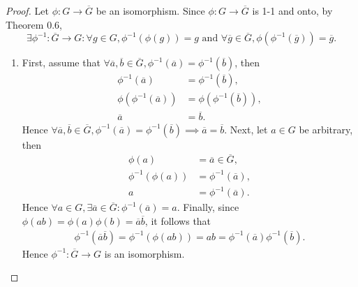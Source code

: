 \documentclass{article}
\theoremstyle{definition}
\begin{document}
 \begin{proof}
     Let $\phi: G \to \overline{G}$ be an isomorphism. Since $\phi:G \to \overline{G}$ is 1-1 and onto, by Theorem 0.6,
         \begin{equation*}
             \exists \phi^{-1}:\overline{G} \to G: \forall g \in G, \phi^{-1}(\phi(g)) = g \text{ and } \forall \overline{g} \in \overline{G}, \phi(\phi^{-1}(\overline{g})) = \overline{g}. 
         \end{equation*}
     \begin{enumerate}[label=(\roman*)]
         \item First, assume that $\forall \overline{a}, \overline{b} \in \overline{G}, \phi^{-1}(\overline{a}) = \phi^{-1}(\overline{b})$, then
         \begin{align*}
             \phi^{-1}(\overline{a}) &= \phi^{-1}(\overline{b}), \\
             \phi(\phi^{-1}(\overline{a})) &= \phi(\phi^{-1}(\overline{b})), \\
             \overline{a} &= \overline{b}.
         \end{align*}
         Hence $\forall \overline{a}, \overline{b} \in \overline{G}, \phi^{-1}(\overline{a}) = \phi^{-1}(\overline{b}) \implies \overline{a} = \overline{b}$. Next, let $a \in G$ be arbitrary, then
         \begin{align*}
             \phi(a) &= \overline{a} \in \overline{G}, \\
             \phi^{-1}(\phi(a)) &= \phi^{-1}(\overline{a}), \\
             a &= \phi^{-1}(\overline{a}).
         \end{align*}
         Hence $\forall a \in G, \exists \overline{a} \in \overline{G}: \phi^{-1}(\overline{a}) = a$. Finally, since $\phi(ab) = \phi(a)\phi(b) = \overline{a}\overline{b}$, it follows that
         \begin{align*}
             \phi^{-1}(\overline{a}\overline{b}) = \phi^{-1}(\phi(ab)) = ab = \phi^{-1}(\overline{a})\phi^{-1}(\overline{b}). 
         \end{align*}
         Hence $\phi^{-1}:\overline{G} \to G$ is an isomorphism.
         

\end{enumerate}
\end{proof}
\end{document}

